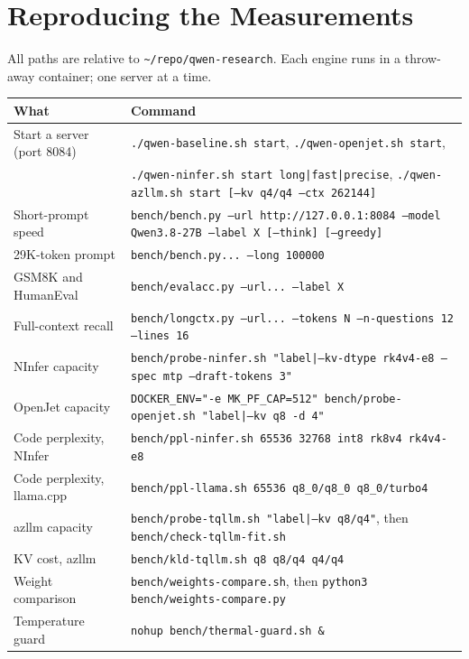 \section{Reproducing the Measurements}
\label{app:repro}

All paths are relative to \texttt{\textasciitilde/repo/qwen-research}. Each engine runs in a
throw-away container; one server at a time.

\begin{table}[h]
  \centering
  \small
  \begin{tabular}{@{}lp{}@{}}
    \toprule
    What & Command \\
    \midrule
    Start a server (port 8084) & \texttt{./qwen-baseline.sh start}, \texttt{./qwen-openjet.sh start}, \\
                               & \texttt{./qwen-ninfer.sh start long|fast|precise}, \texttt{./qwen-azllm.sh start [--kv q4/q4 --ctx 262144]} \\
    Short-prompt speed & \texttt{bench/bench.py --url http://127.0.0.1:8084 --model Qwen3.8-27B --label X [--think] [--greedy]} \\
    29K-token prompt & \texttt{bench/bench.py... --long 100000} \\
    GSM8K and HumanEval & \texttt{bench/evalacc.py --url... --label X} \\
    Full-context recall & \texttt{bench/longctx.py --url... --tokens N --n-questions 12 --lines 16} \\
    NInfer capacity & \texttt{bench/probe-ninfer.sh "label|--kv-dtype rk4v4-e8 --spec mtp --draft-tokens 3"} \\
    OpenJet capacity & \texttt{DOCKER\_ENV="-e MK\_PF\_CAP=512" bench/probe-openjet.sh "label|--kv q8 -d 4"} \\
    Code perplexity, NInfer & \texttt{bench/ppl-ninfer.sh 65536 32768 int8 rk8v4 rk4v4-e8} \\
    Code perplexity, llama.cpp & \texttt{bench/ppl-llama.sh 65536 q8\_0/q8\_0 q8\_0/turbo4} \\
    azllm capacity & \texttt{bench/probe-tqllm.sh "label|--kv q8/q4"}, then \texttt{bench/check-tqllm-fit.sh} \\
    KV cost, azllm & \texttt{bench/kld-tqllm.sh q8 q8/q4 q4/q4} \\
    Weight comparison & \texttt{bench/weights-compare.sh}, then \texttt{python3 bench/weights-compare.py} \\
    Temperature guard & \texttt{nohup bench/thermal-guard.sh \&} \\
    \bottomrule
  \end{tabular}
\end{table}

